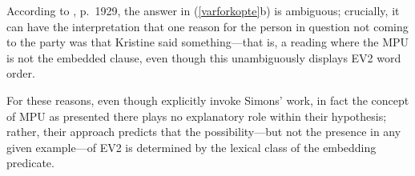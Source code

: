\documentclass[output=paper]{LSP/langsci}
\begin{document}
According to \cite{wiklund-etal09}, p.~1929, the answer in (\ref{varforkopte}b) is ambiguous; crucially, it can have the interpretation that one reason for the person in question not coming to the party was that Kristine said something---that is, a reading where the MPU is not the embedded clause, even though this unambiguously displays EV2 word order.

For these reasons, even though \cite{wiklund-etal09} explicitly invoke Simons' work, in fact the concept of MPU as presented there plays no explanatory role within their hypothesis; rather, their approach predicts that the possibility---but not the presence in any given example---of EV2 is determined by the lexical class of the embedding predicate. 

%
\end{document}
